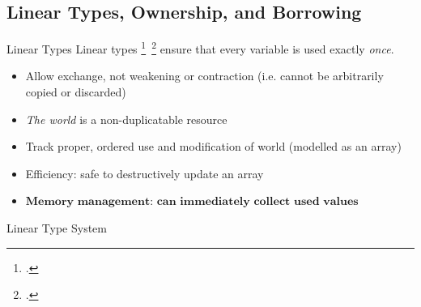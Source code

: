 \documentclass[aspectratio=169]{beamer}
\begin{document}
\subsection{Linear Types, Ownership, and Borrowing}

\begin{frame}{Linear Types}
    Linear types \footcite{girard_linear_1987}\ \footcite{wadler_linear_1990} ensure that every variable is used exactly \emph{once}.
    \begin{itemize}
        \item Allow exchange, not weakening or contraction (i.e. cannot be arbitrarily copied or discarded)
        \item \emph{The world} is a non-duplicatable resource %
        \item Track proper, ordered use and modification of world (modelled as an array)
        \item Efficiency: safe to destructively update an array
        \item $\textbf{Memory management: can immediately collect used values}$ %
    \end{itemize}
\end{frame}

\begin{frame}{Linear Type System}
\end{frame}
\end{document}
